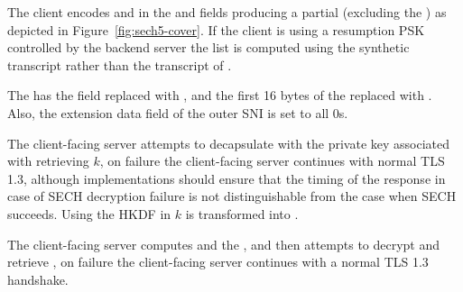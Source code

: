 


The client encodes  and  in the   and  fields producing a partial 
(excluding the )
as depicted in Figure~\ref{fig:sech5-cover}.
If the client is using a resumption \ac{PSK} controlled by the backend server
the  list is computed
using the synthetic  transcript rather
than the transcript of .

The  has the  field replaced with \varsechinnerrandom{}, and the first 16 bytes of the
\varlegacysessionid{} replaced with .
Also, the extension data field of the outer \ac{SNI} is set to all 0s.

The client-facing server attempts to decapsulate  with the private key associated with  retrieving $k$, on failure 
the client-facing server continues with normal TLS 1.3,
although implementations should ensure that the timing of the response in case of \ac{SECH}
decryption failure is not distinguishable from the case when
\ac{SECH} succeeds.
Using the \ac{HKDF} in  $k$ is transformed into \varsechinnerrandom{}.


The client-facing server computes  and the \nonce, and then attempts to decrypt and retrieve , on failure  
the client-facing server continues with a normal TLS 1.3 handshake.


